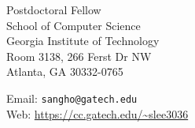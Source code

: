 \begin{minipage}[t]{0.45\textwidth}
  Postdoctoral Fellow\\
  School of Computer Science\\
  Georgia Institute of Technology\\
  Room 3138, 266 Ferst Dr NW\\
  Atlanta, GA 30332-0765
\end{minipage}
\begin{minipage}[t]{0.45\textwidth}
  Email: \texttt{sangho@gatech.edu} \\
  Web: \url{https://cc.gatech.edu/~slee3036} \\
\end{minipage}
